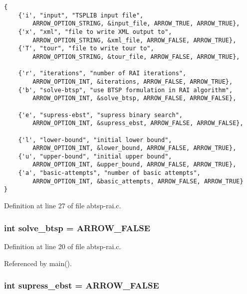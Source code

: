 \begin{Code}\begin{verbatim} 
{
    {'i', "input", "TSPLIB input file", 
        ARROW_OPTION_STRING, &input_file, ARROW_TRUE, ARROW_TRUE},
    {'x', "xml", "file to write XML output to",
        ARROW_OPTION_STRING, &xml_file, ARROW_FALSE, ARROW_TRUE},
    {'T', "tour", "file to write tour to",
        ARROW_OPTION_STRING, &tour_file, ARROW_FALSE, ARROW_TRUE},
    
    {'r', "iterations", "number of RAI iterations",
        ARROW_OPTION_INT, &iterations, ARROW_FALSE, ARROW_TRUE},
    {'b', "solve-btsp", "use BTSP formulation in RAI algorithm",
        ARROW_OPTION_INT, &solve_btsp, ARROW_FALSE, ARROW_FALSE},
        
    {'e', "supress-ebst", "supress binary search",
        ARROW_OPTION_INT, &supress_ebst, ARROW_FALSE, ARROW_FALSE},
        
    {'l', "lower-bound", "initial lower bound",
        ARROW_OPTION_INT, &lower_bound, ARROW_FALSE, ARROW_TRUE},
    {'u', "upper-bound", "initial upper bound",
        ARROW_OPTION_INT, &upper_bound, ARROW_FALSE, ARROW_TRUE},
    {'a', "basic-attempts", "number of basic attempts",
        ARROW_OPTION_INT, &basic_attempts, ARROW_FALSE, ARROW_TRUE}
}
\end{verbatim}
\end{Code}


Definition at line 27 of file abtsp-rai.c.\hypertarget{abtsp-rai_8c_de7f7731dd87b73e02ed30fd099d5cc5}{
\subsubsection{\setlength{\rightskip}{0pt plus 5cm}int {\bf solve\_\-btsp} = ARROW\_\-FALSE}}
\label{abtsp-rai_8c_de7f7731dd87b73e02ed30fd099d5cc5}




Definition at line 20 of file abtsp-rai.c.

Referenced by main().\hypertarget{abtsp-rai_8c_502a0aac74d070b870b1c096d9d8520d}{
\subsubsection{\setlength{\rightskip}{0pt plus 5cm}int {\bf supress\_\-ebst} = ARROW\_\-FALSE}}
\label{abtsp-rai_8c_502a0aac74d070b870b1c096d9d8520d}




